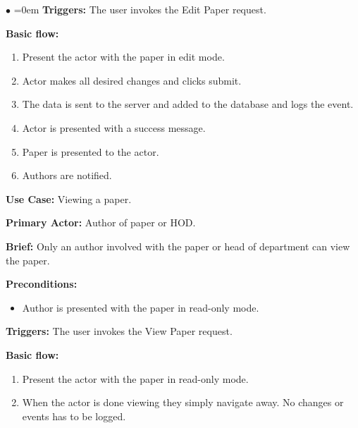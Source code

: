 \documentclass[english]{article}
\begin{document}
\begin{list}{$\bullet$}{\leftmargin=1.5cm \itemindent=0em}
				\textbf{Triggers:} The user invokes the Edit Paper request.
				
				\textbf{Basic flow:}
					\begin{enumerate}
						\item Present the actor with the paper in edit mode.
						\item Actor makes all desired changes and clicks submit.
						\item The data is sent to the server and added to the database and logs the event.
						\item Actor is presented with a success message.
						\item Paper is presented to the actor.
						\item Authors are notified.
					\end{enumerate}
					
					\item\textbf{Use Case:} Viewing a paper.
					
					\textbf{Primary Actor:} Author of paper or HOD.
					
					\textbf{Brief:} Only an author involved with the paper or head of department can view the paper.
					
					\textbf{Preconditions:}
					\begin{itemize}
						\item Author is presented with the paper in read-only mode.
					\end{itemize}
					
					\textbf{Triggers:} The user invokes the View Paper request.
					
					\textbf{Basic flow:}
					\begin{enumerate}
						\item Present the actor with the paper in read-only mode.
						\item When the actor is done viewing they simply navigate away. No changes or events has to be logged.
					\end{enumerate}
			\end{list}
\end{document}

